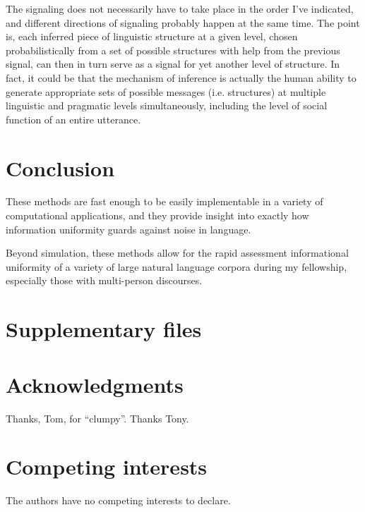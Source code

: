 \documentclass[12pt]{article}
\begin{document}
The signaling does not necessarily have to take place in the order I've indicated, and different directions of signaling probably happen at the same time. The point is, each inferred piece of linguistic structure at a given level, chosen probabilistically from a set of possible structures with help from the previous signal, can then in turn serve as a signal for yet another level of structure. In fact, it could be that the mechanism of inference is actually the human ability to generate appropriate sets of possible messages (i.e. structures) at multiple linguistic and pragmatic levels simultaneously, including the level of social function of an entire utterance. 

\section{Conclusion}

These methods are fast enough to be easily implementable in a variety of computational applications, and they provide insight into exactly how information uniformity guards against noise in language.

Beyond simulation, these methods allow for the rapid assessment informational uniformity of a variety of large natural language corpora during my fellowship, especially those with multi-person discourses.

\section*{Supplementary files}

\section*{Acknowledgments}

Thanks, Tom, for ``clumpy''. Thanks Tony.

\section*{Competing interests}

The authors have no competing interests to declare.




\end{document}
